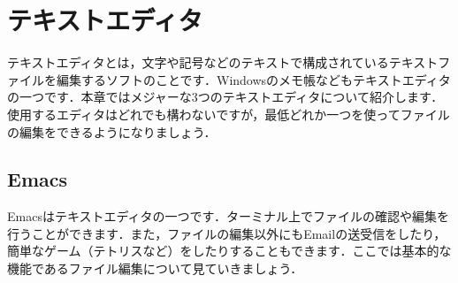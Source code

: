\documentclass{jarticle}
\begin{document}
\newpage
\section{テキストエディタ}
テキストエディタとは，文字や記号などのテキストで構成されているテキストファイルを編集するソフトのことです．Windowsのメモ帳などもテキストエディタの一つです．本章ではメジャーな3つのテキストエディタについて紹介します．使用するエディタはどれでも構わないですが，最低どれか一つを使ってファイルの編集をできるようになりましょう．
\subsection{Emacs}
Emacsはテキストエディタの一つです．ターミナル上でファイルの確認や編集を行うことができます．また，ファイルの編集以外にもEmailの送受信をしたり，簡単なゲーム（テトリスなど）をしたりすることもできます．ここでは基本的な機能であるファイル編集について見ていきましょう．



\end{document}
